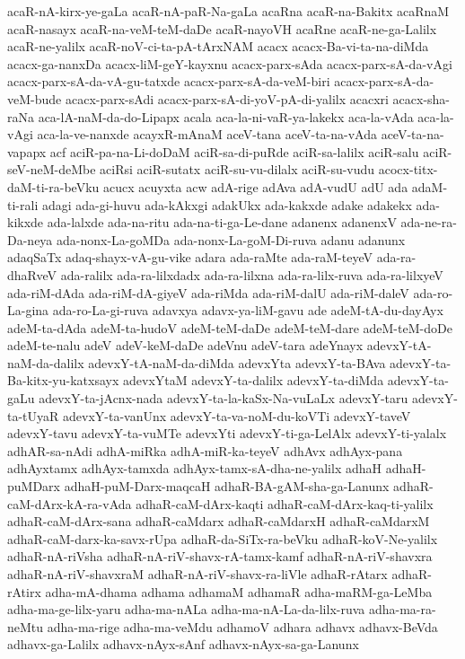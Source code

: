 {acaR-nA-kirx-ye-gaLa
acaR-nA-paR-Na-gaLa
acaRna
acaR-na-Bakitx
acaRnaM
acaR-nasayx
acaR-na-veM-teM-daDe
acaR-nayoVH
acaRne
acaR-ne-ga-Lalilx
acaR-ne-yalilx
acaR-noV-ci-ta-pA-tArxNAM
acacx
acacx-Ba-vi-ta-na-diMda
acacx-ga-nanxDa
acacx-liM-geY-kayxnu
acacx-parx-sAda
acacx-parx-sA-da-vAgi
acacx-parx-sA-da-vA-gu-tatxde
acacx-parx-sA-da-veM-biri
acacx-parx-sA-da-veM-bude
acacx-parx-sAdi
acacx-parx-sA-di-yoV-pA-di-yalilx
acacxri
acacx-sha-raNa
aca-lA-naM-da-do-Lipapx
acala
aca-la-ni-vaR-ya-lakekx
aca-la-vAda
aca-la-vAgi
aca-la-ve-nanxde
acayxR-mAnaM
aceV-tana
aceV-ta-na-vAda
aceV-ta-na-vapapx
acf
aciR-pa-na-Li-doDaM
aciR-sa-di-puRde
aciR-sa-lalilx
aciR-salu
aciR-seV-neM-deMbe
aciRsi
aciR-sutatx
aciR-su-vu-dilalx
aciR-su-vudu
acocx-titx-daM-ti-ra-beVku
acucx
acuyxta
acw
adA-rige
adAva
adA-vudU
adU
ada
adaM-ti-rali
adagi
ada-gi-huvu
ada-kAkxgi
adakUkx
ada-kakxde
adake
adakekx
ada-kikxde
ada-lalxde
ada-na-ritu
ada-na-ti-ga-Le-dane
adanenx
adanenxV
ada-ne-ra-Da-neya
ada-nonx-La-goMDa
ada-nonx-La-goM-Di-ruva
adanu
adanunx
adaqSaTx
adaq-shayx-vA-gu-vike
adara
ada-raMte
ada-raM-teyeV
ada-ra-dhaRveV
ada-ralilx
ada-ra-lilxdadx
ada-ra-lilxna
ada-ra-lilx-ruva
ada-ra-lilxyeV
ada-riM-dAda
ada-riM-dA-giyeV
ada-riMda
ada-riM-dalU
ada-riM-daleV
ada-ro-La-gina
ada-ro-La-gi-ruva
adavxya
adavx-ya-liM-gavu
ade
adeM-tA-du-dayAyx
adeM-ta-dAda
adeM-ta-hudoV
adeM-teM-daDe
adeM-teM-dare
adeM-teM-doDe
adeM-te-nalu
adeV
adeV-keM-daDe
adeVnu
adeV-tara
adeYnayx
adevxY-tA-naM-da-dalilx
adevxY-tA-naM-da-diMda
adevxYta
adevxY-ta-BAva
adevxY-ta-Ba-kitx-yu-katxsayx
adevxYtaM
adevxY-ta-dalilx
adevxY-ta-diMda
adevxY-ta-gaLu
adevxY-ta-jAcnx-nada
adevxY-ta-la-kaSx-Na-vuLaLx
adevxY-taru
adevxY-ta-tUyaR
adevxY-ta-vanUnx
adevxY-ta-va-noM-du-koVTi
adevxY-taveV
adevxY-tavu
adevxY-ta-vuMTe
adevxYti
adevxY-ti-ga-LelAlx
adevxY-ti-yalalx
adhAR-sa-nAdi
adhA-miRka
adhA-miR-ka-teyeV
adhAvx
adhAyx-pana
adhAyxtamx
adhAyx-tamxda
adhAyx-tamx-sA-dha-ne-yalilx
adhaH
adhaH-puMDarx
adhaH-puM-Darx-maqcaH
adhaR-BA-gAM-sha-ga-Lanunx
adhaR-caM-dArx-kA-ra-vAda
adhaR-caM-dArx-kaqti
adhaR-caM-dArx-kaq-ti-yalilx
adhaR-caM-dArx-sana
adhaR-caMdarx
adhaR-caMdarxH
adhaR-caMdarxM
adhaR-caM-darx-ka-savx-rUpa
adhaR-da-SiTx-ra-beVku
adhaR-koV-Ne-yalilx
adhaR-nA-riVsha
adhaR-nA-riV-shavx-rA-tamx-kamf
adhaR-nA-riV-shavxra
adhaR-nA-riV-shavxraM
adhaR-nA-riV-shavx-ra-liVle
adhaR-rAtarx
adhaR-rAtirx
adha-mA-dhama
adhama
adhamaM
adhamaR
adha-maRM-ga-LeMba
adha-ma-ge-lilx-yaru
adha-ma-nALa
adha-ma-nA-La-da-lilx-ruva
adha-ma-ra-neMtu
adha-ma-rige
adha-ma-veMdu
adhamoV
adhara
adhavx
adhavx-BeVda
adhavx-ga-Lalilx
adhavx-nAyx-sAnf
adhavx-nAyx-sa-ga-Lanunx
}
